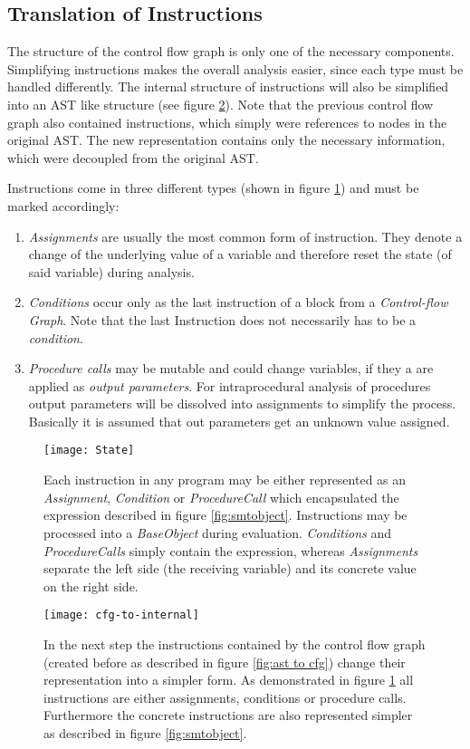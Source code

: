 \subsection{Translation of Instructions}
\label{subsec:translate instructions}
The structure of the control flow graph is only one of the necessary components. 
Simplifying instructions makes the overall analysis easier, since each type must be handled differently.
The internal structure of instructions will also be simplified into an AST like structure (see figure \ref{fig:cfg to internal}). 
Note that the previous control flow graph also contained instructions, which simply were references to nodes in the original AST. 
The new representation contains only the necessary information, which were decoupled from the original AST.

Instructions come in three different types (shown in figure \ref{fig:state}) and must be marked accordingly:
\begin{enumerate}
	\item \emph{Assignments} are usually the most common form of instruction. They denote a change of the underlying value of a variable and therefore reset the state (of said variable) during analysis. 
	\item \emph{Conditions} occur only as the last instruction of a block from a \emph{Control-flow Graph}. Note that the last Instruction does not necessarily has to be a \emph{condition}.
	\item \emph{Procedure calls} may be mutable and could change variables, if they a are applied as \emph{output parameters}. %
	For intraprocedural analysis of procedures output parameters will be dissolved into assignments to simplify the process. Basically it is assumed that out parameters get an unknown value assigned. 
\end{enumerate}
\begin{figure}[h!]
	\centering
	\texttt{[image: State]}
	\caption{Each instruction in any program may be either represented as an \emph{Assignment}, \emph{Condition} or \emph{ProcedureCall} which encapsulated the expression described in figure \ref{fig:smtobject}. Instructions may be processed into a \emph{BaseObject} during evaluation. \emph{Conditions} and \emph{ProcedureCalls} simply contain the expression, whereas \emph{Assignments} separate the left side (the receiving variable) and its concrete value on the right side.}
	\label{fig:state}
\end{figure}
\begin{figure}[h!]
	\centering
	\texttt{[image: cfg-to-internal]}
	\caption{In the next step the instructions contained by the control flow graph (created before as described in figure \ref{fig:ast to cfg}) change their representation into a simpler form. As demonstrated in figure \ref{fig:state} all instructions are either assignments, conditions or procedure calls. Furthermore the concrete instructions are also represented simpler as described in figure \ref{fig:smtobject}. }
	\label{fig:cfg to internal}
\end{figure}

